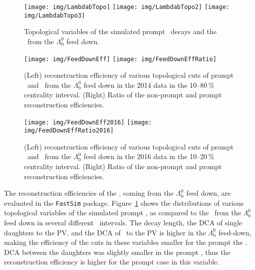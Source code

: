 \begin{figure}[!htb]
\centering
\texttt{[image: img/LambdabTopo]}
\texttt{[image: img/LambdabTopo2]}
\texttt{[image: img/LambdabTopo3]}
\caption{\label{LambdabTopo} Topological variables of the simulated prompt \Lambdac\ decays and the \Lambdac\ from the $\Lambda_\mathrm{b}^0$ feed down.}
\end{figure}

\begin{figure}[!htb]
\centering
\texttt{[image: img/FeedDownEff]}
\texttt{[image: img/FeedDownEffRatio]}
\caption{\label{FeedDownEff} (Left) reconstruction efficiency of various topological cuts of prompt \Lambdac\ and \Lambdac\ from the $\Lambda_\mathrm{b}^0$ feed down in the 2014 data in the 10--80$\,\%$ centrality interval. (Right) Ratio of the non-prompt and prompt reconstruction efficiencies.}
\end{figure}

\begin{figure}[!htb]
\centering
\texttt{[image: img/FeedDownEff2016]}
\texttt{[image: img/FeedDownEffRatio2016]}
\caption{\label{FeedDownEff2016} (Left) reconstruction efficiency of various topological cuts of prompt \Lambdac\ and \Lambdac\ from the $\Lambda_\mathrm{b}^0$ feed down in the 2016 data in the 10--20$\,\%$ centrality interval. (Right) Ratio of the non-prompt and prompt reconstruction efficiencies.}
\end{figure}

The reconstruction efficiencies of the \Lambdac, coming from the $\Lambda_\mathrm{b}^0$ feed down, are evaluated in the \texttt{FastSim} package. Figure~\ref{LambdabTopo} shows the distributions of various topological variables of the simulated prompt \Lambdac, as compared to the \Lambdac\ from the $\Lambda_\mathrm{b}^0$ feed down in several different \pt\ intervals. The decay length, the DCA of single daughters to the PV, and the DCA of \Lambdac\ to the PV is higher in the $\Lambda_\mathrm{b}^0$ feed-down, making the efficiency of the cuts in these variables smaller for the prompt the \Lambdac\@. DCA between the daughters was slightly smaller in the prompt \Lambdac, thus the reconstruction efficiency is higher for the prompt case in this variable\@.


